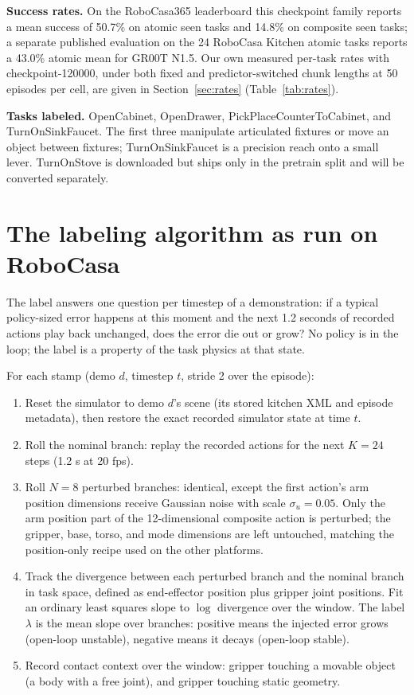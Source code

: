 \documentclass[11pt]{article}
\begin{document}
\textbf{Success rates.} On the RoboCasa365 leaderboard this checkpoint family
reports a mean success of 50.7\% on atomic seen tasks and 14.8\% on composite
seen tasks; a separate published evaluation on the 24 RoboCasa Kitchen atomic
tasks reports a 43.0\% atomic mean for GR00T N1.5. Our own measured per-task
rates with checkpoint-120000, under both fixed and predictor-switched chunk
lengths at 50 episodes per cell, are given in
Section~\ref{sec:rates} (Table~\ref{tab:rates}).

\textbf{Tasks labeled.} OpenCabinet, OpenDrawer, PickPlaceCounterToCabinet, and
TurnOnSinkFaucet. The first three manipulate articulated fixtures or move an
object between fixtures; TurnOnSinkFaucet is a precision reach onto a small
lever. TurnOnStove is downloaded but ships only in the pretrain split and will
be converted separately.

\section{The labeling algorithm as run on RoboCasa}
\label{sec:algo}

The label answers one question per timestep of a demonstration: if a typical
policy-sized error happens at this moment and the next 1.2 seconds of recorded
actions play back unchanged, does the error die out or grow? No policy is in
the loop; the label is a property of the task physics at that state.

For each stamp (demo $d$, timestep $t$, stride 2 over the episode):
\begin{enumerate}[leftmargin=1.6em,itemsep=1pt]
\item Reset the simulator to demo $d$'s scene (its stored kitchen XML and
episode metadata), then restore the exact recorded simulator state at time $t$.
\item Roll the nominal branch: replay the recorded actions for the next
$K{=}24$ steps (1.2 s at 20 fps).
\item Roll $N{=}8$ perturbed branches: identical, except the first action's arm
position dimensions receive Gaussian noise with scale $\sigma_u{=}0.05$. Only
the arm position part of the 12-dimensional composite action is perturbed; the
gripper, base, torso, and mode dimensions are left untouched, matching the
position-only recipe used on the other platforms.
\item Track the divergence between each perturbed branch and the nominal branch
in task space, defined as end-effector position plus gripper joint positions.
Fit an ordinary least squares slope to $\log$ divergence over the window. The
label $\lambda$ is the mean slope over branches: positive means the injected
error grows (open-loop unstable), negative means it decays (open-loop stable).
\item Record contact context over the window: gripper touching a movable object
(a body with a free joint), and gripper touching static geometry.
\end{enumerate}
\end{document}
